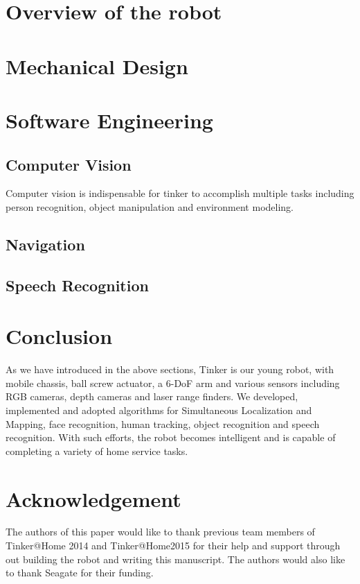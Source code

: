 \documentclass[runningheads,a4paper]{llncs}
\begin{document}
\section{Overview of the robot}



\section{Mechanical Design}


\section{Software Engineering}
\subsection{Computer Vision}
Computer vision is indispensable for tinker to accomplish multiple tasks including person recognition, object manipulation and environment modeling.


\subsection{Navigation}


\subsection{Speech Recognition}




\section{Conclusion}

As we have introduced in the above sections, Tinker is our young robot, with mobile chassis, ball screw actuator, a 6-DoF arm and various sensors including RGB cameras, depth cameras and laser range finders. We developed, implemented and adopted algorithms for Simultaneous Localization and Mapping, face recognition, human tracking, object recognition and speech recognition. With such efforts, the robot becomes intelligent and is capable of completing a variety of home service tasks. 



\section*{Acknowledgement}
The authors of this paper would like to thank previous team members of Tinker@Home 2014 and Tinker@Home2015 for their help and support through out building the robot and writing this manuscript. The authors would also like to thank Seagate for their funding. 



\end{document}
